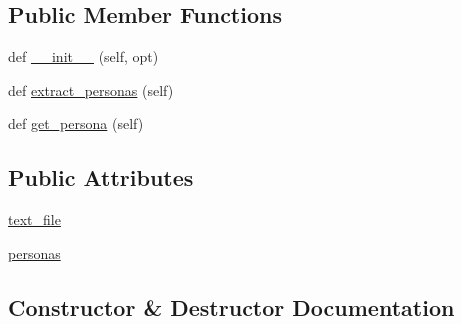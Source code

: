 \subsection*{Public Member Functions}
\begin{DoxyCompactItemize}
\item 
def \hyperlink{classprojects_1_1controllable__dialogue_1_1mturk_1_1worlds_1_1PersonasGenerator_a75f010d08625f01ab710857ffb490372}{\+\_\+\+\_\+init\+\_\+\+\_\+} (self, opt)
\item 
def \hyperlink{classprojects_1_1controllable__dialogue_1_1mturk_1_1worlds_1_1PersonasGenerator_aa850e152f50cbd96ea6899a830bdad10}{extract\+\_\+personas} (self)
\item 
def \hyperlink{classprojects_1_1controllable__dialogue_1_1mturk_1_1worlds_1_1PersonasGenerator_a788311f725f83f4f6da141df5241ca11}{get\+\_\+persona} (self)
\end{DoxyCompactItemize}
\subsection*{Public Attributes}
\begin{DoxyCompactItemize}
\item 
\hyperlink{classprojects_1_1controllable__dialogue_1_1mturk_1_1worlds_1_1PersonasGenerator_af1584a9c62e442bd5991c9332d809b9e}{text\+\_\+file}
\item 
\hyperlink{classprojects_1_1controllable__dialogue_1_1mturk_1_1worlds_1_1PersonasGenerator_a1ac9eda4d2584436eda2d19cccb4c70a}{personas}
\end{DoxyCompactItemize}


\subsection{Constructor \& Destructor Documentation}
\mbox{\label{classprojects_1_1controllable__dialogue_1_1mturk_1_1worlds_1_1PersonasGenerator_a75f010d08625f01ab710857ffb490372}} 
